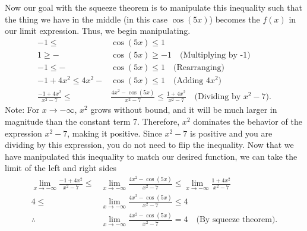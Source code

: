\documentclass{report}
\begin{document}
      \bigbreak \noindent 
      Now our goal with the squeeze theorem is to manipulate this inequality such that the thing we have in the middle (in this case $\cos{(5x)}$) becomes the $f(x)$ in our limit expression.
      \bigbreak \noindent 
      Thus, we begin manipulating.
      \begin{align*}
        -1 \leq &\cos{(5x)} \leq 1 \\
        1 \geq -&\cos{(5x)} \geq -1 \quad \text{(Multiplying by -1)}  \\
        -1 \leq -&\cos{(5x)} \leq 1 \quad \text{(Rearranging)} \\
        -1+4x^{2} \leq 4x^{2}-&\cos{(5x)} \leq 1 \quad \text{(Adding $4x^{2}$)} \\
        \frac{-1+4x^{2}}{x^{2}-7} \leq &\frac{4x^{2}-\cos{(5x)}}{x^{2}-7} \leq \frac{1+4x^{2}}{x^{2}-7} \quad \text{(Dividing by $x^{2}-7$)}
      .\end{align*}
      Note: For \( x \to -\infty \), \( x^2 \) grows without bound, and it will be much larger in magnitude than the constant term 7. Therefore, \( x^2 \) dominates the behavior of the expression \( x^2 - 7 \), making it positive. Since \( x^2 - 7 \) is positive and you are dividing by this expression, you do not need to flip the inequality.
      \bigbreak \noindent 
      Now that we have manipulated this inequality to match our desired function, we can take the limit of the left and right sides
      \begin{align*}
        \lim\limits_{x \to -\infty}{\frac{-1+4x^{2}}{x^{2}-7}} \leq &\lim\limits_{x \to -\infty}{\frac{4x^{2}-\cos{(5x)}}{x^{2}-7}} \leq \lim\limits_{x \to -\infty}{\frac{1+4x^{2}}{x^{2}-7}} \\
        4 \leq &\lim\limits_{x \to -\infty}{\frac{4x^{2}-\cos{(5x)}}{x^{2}-7}} \leq 4 \\
        \therefore &\lim\limits_{x \to -\infty}{\frac{4x^{2}-\cos{(5x)}}{x^{2}-7}} = 4 \quad \text{(By squeeze theorem)}
      .\end{align*}

      \bigbreak \noindent 
\end{document}
